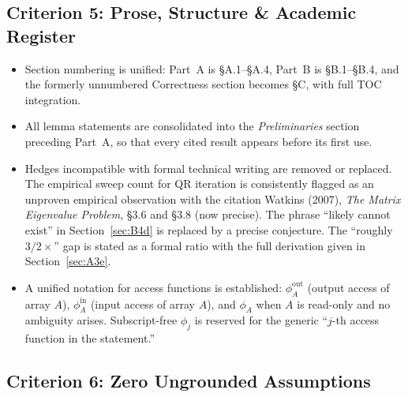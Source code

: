 \documentclass[11pt]{article}
\begin{document}
\subsection*{Criterion 5: Prose, Structure \& Academic Register}

\begin{itemize}[leftmargin=2em]
\item Section numbering is unified: Part~A is \S A.1--\S A.4, Part~B is
  \S B.1--\S B.4, and the formerly unnumbered Correctness section
  becomes \S C, with full TOC integration.
\item All lemma statements are consolidated into the
  \emph{Preliminaries} section preceding Part~A, so that every cited
  result appears before its first use.
\item Hedges incompatible with formal technical writing are removed or
  replaced. The empirical sweep count for QR iteration is consistently
  flagged as an unproven empirical observation with the citation
  Watkins (2007), \emph{The Matrix Eigenvalue Problem}, \S 3.6 and
  \S 3.8 (now precise). The phrase ``likely cannot exist'' in
  Section~\ref{sec:B4d} is replaced by a precise conjecture. The
  ``roughly $3/2\times$'' gap is stated as a formal ratio with the full
  derivation given in Section~\ref{sec:A3e}.
\item A unified notation for access functions is established:
  $\phi^{\mathrm{out}}_A$ (output access of array $A$), $\phi^{\mathrm{in}}_A$
  (input access of array $A$), and $\phi_A$ when $A$ is read-only and
  no ambiguity arises. Subscript-free $\phi_j$ is reserved for the
  generic ``$j$-th access function in the statement.''
\end{itemize}

\subsection*{Criterion 6: Zero Ungrounded Assumptions}
\end{document}
